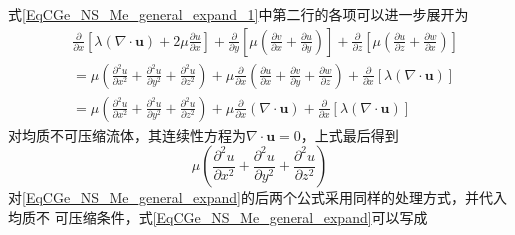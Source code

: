 式\eqref{EqCGe_NS_Me_general_expand_1}中第二行的各项可以进一步展开为
\begin{equation}
  \begin{aligned}
    &\frac{\partial }{\partial x}
    \left[
      \lambda(\nabla\cdot\mathbf{u}) + 2\mu\frac{\partial u}{\partial x}
    \right]
    +\frac{\partial }{\partial y}
    \left[
      \mu
      \left(
      \frac{\partial v}{\partial x}+\frac{\partial u}{\partial y}
      \right)
    \right]
    +\frac{\partial }{\partial z}
    \left[
      \mu
      \left(
      \frac{\partial u}{\partial z}+\frac{\partial w}{\partial x}
      \right)
    \right]
    \\
    &=
    \mu
    \left(
    \frac{\partial^{2} u}{\partial x^{2}} +
    \frac{\partial^{2} u}{\partial y^{2}} +
    \frac{\partial^{2} u}{\partial z^{2}}
    \right)
    +
    \mu
    \frac{\partial}{\partial x}
    \left(
    \frac{\partial u}{\partial x} +
    \frac{\partial v}{\partial y} +
    \frac{\partial w}{\partial z}
    \right)
    +
    \frac{\partial}{\partial x}[\lambda(\nabla\cdot\mathbf{u})]
    \\
    &=
    \mu
    \left(
    \frac{\partial^{2} u}{\partial x^{2}} +
    \frac{\partial^{2} u}{\partial y^{2}} +
    \frac{\partial^{2} u}{\partial z^{2}}
    \right)
    +
    \mu
    \frac{\partial}{\partial x}
    \left(
    \nabla\cdot\mathbf{u}
    \right)
    +
    \frac{\partial}{\partial x}[\lambda(\nabla\cdot\mathbf{u})]
  \end{aligned}
\end{equation}
对均质不可压缩流体，其连续性方程为$\nabla\cdot\mathbf{u}=0$，上式最后得到
\begin{equation}
  \mu
  \left(
  \frac{\partial^{2} u}{\partial x^{2}} +
  \frac{\partial^{2} u}{\partial y^{2}} +
  \frac{\partial^{2} u}{\partial z^{2}}
  \right)
\end{equation}
对\eqref{EqCGe_NS_Me_general_expand}的后两个公式采用同样的处理方式，并代入均质不
可压缩条件，式\eqref{EqCGe_NS_Me_general_expand}可以写成
